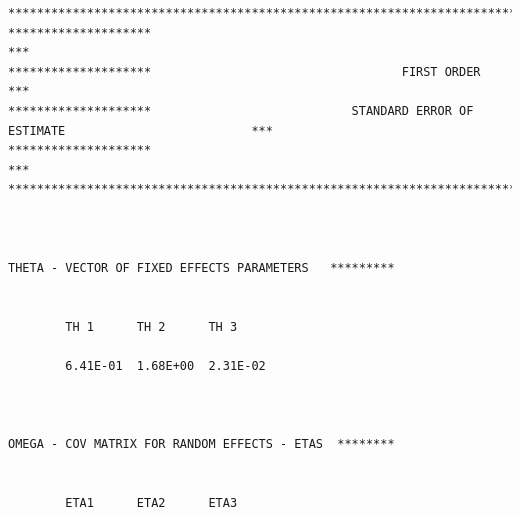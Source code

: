 \documentclass[
  10pt,
]{krantz}
\begin{document}
\begin{verbatim}
*******************************************************************************************************
********************                                                                                ***
********************                                   FIRST ORDER                                  ***
********************                            STANDARD ERROR OF ESTIMATE                          ***
********************                                                                                ***
*******************************************************************************************************
                                                                                                       
                                                                                                       
                                                                                                       
THETA - VECTOR OF FIXED EFFECTS PARAMETERS   *********                                                 
                                                                                                       
                                                                                                       
        TH 1      TH 2      TH 3                                                                       
                                                                                                       
        6.41E-01  1.68E+00  2.31E-02                                                                   
                                                                                                       
                                                                                                       
                                                                                                       
OMEGA - COV MATRIX FOR RANDOM EFFECTS - ETAS  ********                                                 
                                                                                                       
                                                                                                       
        ETA1      ETA2      ETA3                                                                       
                                                                                                       

\end{verbatim}
\end{document}

